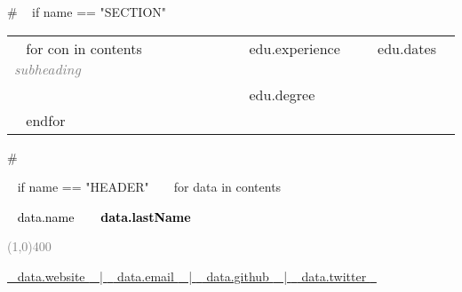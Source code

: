 %

\medskip

\selectfont


\begin{minipage}{\textwidth}

{# 
~{ if name == "SECTION" }~

\begin{tabular}{ p{} %
                   p{} 
                   p{}} %
  ~{ for con in contents }~
  \small\textcolor{gray}{{\emph{ subheading }}} & {~{{ edu.experience }}~} & {\hfill \small{~{{ edu.dates }}~}}\\
  \small & {~{{ edu.degree }}~} & {\hfill} \newline\\
  ~{ endfor }~
\end{tabular}
#}



~{ if name == "HEADER" }~
  ~{ for data in contents }~

    \begin{center} %
    \HUGE\textcolor{black}{~{{ data.name }}~}
    \HUGE\textcolor{black}{\textbf{~{{ data.lastName }}~}}
    \end{center}

    \begin{center}
    \textcolor{gray}{\line(1,0){400}}
    \end{center}

    \begin{center}
    \footnotesize 
    \href{~{{ data.websiteURL }}~}{\faHome \hspace{0.05cm} ~{{ data.website }}~ | \hspace{0.1cm}}
    \href{mailto: ~{{ data.email }}~ }{\faEnvelope \hspace{0.05cm} ~{{ data.email }}~ | \hspace{0.1cm}} 
    \href{~{{ data.githubURL }}~}{\faGithub \hspace{0.05cm} ~{{ data.github }}~ | \hspace{0.1cm}}
    \href{~{{ data.twitterURL }}~}{\faTwitter \hspace{0.05cm} ~{{ data.twitter }}~ }  
    \end{center}


\end{minipage}
